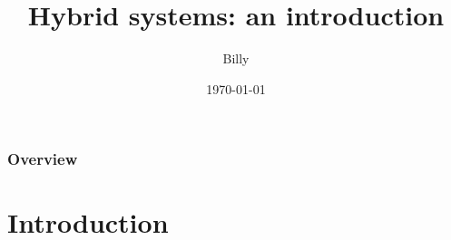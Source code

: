 \documentclass{beamer}
\title{Hybrid systems: an introduction} %
\author{Billy} %
\institute[UBA] %
{
Universidad de Buenos Aires\\ %
\medskip
\textit{billy.mosse@gmail.com} \\ %


\tiny{Robé el template de internet} \\

}
\date{\today} %
\begin{document}
\begin{frame}
\titlepage %
\end{frame}

\begin{frame}
\frametitle{Overview} %
\tableofcontents %
\end{frame}


\section{Introduction} %


\end{document}
